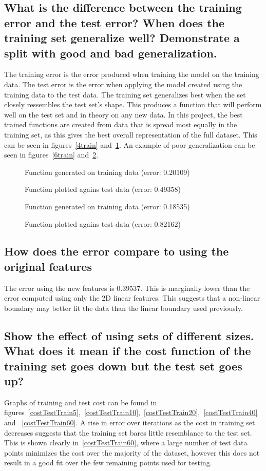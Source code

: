 \documentclass[titlepage]{scrartcl}
\begin{document}
\subsection{What is the difference between the training error and the test
    error? When does the training set generalize well? Demonstrate a split with
good and bad generalization.}
The training error is the error produced when training the model on the
training data. The test error is the error when applying the model created
using the training data to the test data.
The training set generalizes best when the set closely ressembles the test
set's shape. This produces a function that will perform well on the test set
and in theory on any new data. In this project, the best trained functions are
created from data that is spread most equally in the training set, as this
gives the best overall representation of the full dataset. This can be seen in
figures~\ref{4train} and~\ref{4test}. An example of poor generalization can be
seen in figures~\ref{6train} and~\ref{6test}.

\begin{figure}
    \caption{Function generated on training data (error: 0.20109)}
    \label{4train}
    \caption{Function plotted agains test data (error: 0.49358)}
    \label{4test}
\end{figure}
\begin{figure}
    \caption{Function generated on training data (error: 0.18535)}
    \label{6train}
    \caption{Function plotted agains test data (error: 0.82162)}
    \label{6test}
\end{figure}

\subsection{How does the error compare to using the original features}
The error using the new features is 0.39537. This is marginally lower than the
error computed using only the 2D linear features. This suggests that a
non-linear boundary may better fit the data than the linear boundary used
previously.

\subsection{Show the effect of using sets of different sizes. What does it mean
if the cost function of the training set goes down but the test set goes up?}
Graphs of training and test cost can be found in
figures~\ref{costTestTrain5},~\ref{costTestTrain10},~\ref{costTestTrain20},~\ref{costTestTrain40}
and ~\ref{costTestTrain60}.
A rise in error over iterations as the cost in training set decreases suggests
that the training set bares little resemblance to the test set. This is shown
clearly in~\ref{costTestTrain60}, where a large number of test data points
minimizes the cost over the majority of the dataset, however this does not
result in a good fit over the few remaining points used for testing.
\end{document}
